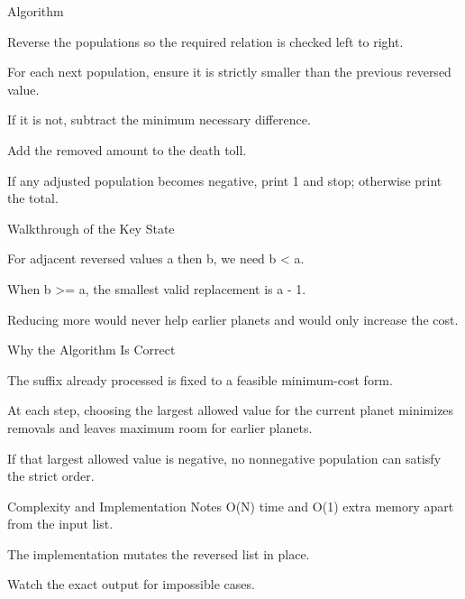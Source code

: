 \documentclass[aspectratio=169,11pt]{beamer}
\begin{document}
\begin{frame}{Algorithm}
\begin{tightitemize}
  \item Reverse the populations so the required relation is checked left to right.
  \item For each next population, ensure it is strictly smaller than the previous reversed value.
  \item If it is not, subtract the minimum necessary difference.
  \item Add the removed amount to the death toll.
  \item If any adjusted population becomes negative, print 1 and stop; otherwise print the total.
\end{tightitemize}
\end{frame}

\begin{frame}{Walkthrough of the Key State}
\begin{tightitemize}
  \item For adjacent reversed values a then b, we need b < a.
  \item When b >= a, the smallest valid replacement is a - 1.
  \item Reducing more would never help earlier planets and would only increase the cost.
\end{tightitemize}
\end{frame}

\begin{frame}{Why the Algorithm Is Correct}
\begin{tightitemize}
  \item The suffix already processed is fixed to a feasible minimum-cost form.
  \item At each step, choosing the largest allowed value for the current planet minimizes removals and leaves maximum room for earlier planets.
  \item If that largest allowed value is negative, no nonnegative population can satisfy the strict order.
\end{tightitemize}
\end{frame}

\begin{frame}{Complexity and Implementation Notes}
\small
{} O(N) time and O(1) extra memory apart from the input list.

\vspace{0.3cm}
\begin{tightitemize}
  \item The implementation mutates the reversed list in place.
  \item Watch the exact output for impossible cases.
\end{tightitemize}
\end{frame}
\end{document}
